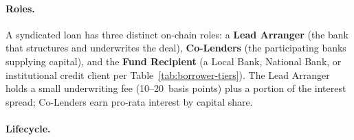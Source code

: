 \documentclass[12pt,a4paper]{report}
\begin{document}
\paragraph{Roles.}
A syndicated loan has three distinct on-chain roles: a \textbf{Lead Arranger} (the bank that structures and underwrites the deal), \textbf{Co-Lenders} (the participating banks supplying capital), and the \textbf{Fund Recipient} (a Local Bank, National Bank, or institutional credit client per Table~\ref{tab:borrower-tiers}). The Lead Arranger holds a small underwriting fee (10--20~basis points) plus a portion of the interest spread; Co-Lenders earn pro-rata interest by capital share.

\paragraph{Lifecycle.}
\end{document}
